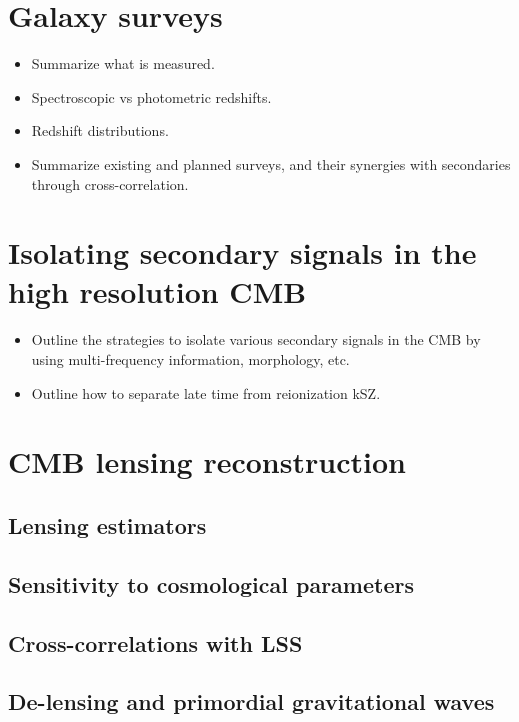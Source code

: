 \documentclass[aps,nofootinbib,groupedaddress]{revtex4}
\begin{document}
\section{Galaxy surveys}

\begin{itemize}
\item Summarize what is measured.
\item Spectroscopic vs photometric redshifts.
\item Redshift distributions.
\item Summarize existing and planned surveys, and their synergies with secondaries through cross-correlation. 
\end{itemize}

\section{Isolating secondary signals in the high resolution CMB}

\begin{itemize}
\item Outline the strategies to isolate various secondary signals in the CMB by using multi-frequency information, morphology, etc.
\item Outline how to separate late time from reionization kSZ.
\end{itemize}

\section{CMB lensing reconstruction}

\subsection{Lensing estimators}

\subsection{Sensitivity to cosmological parameters}

\subsection{Cross-correlations with LSS}

\subsection{De-lensing and primordial gravitational waves}
\end{document}
